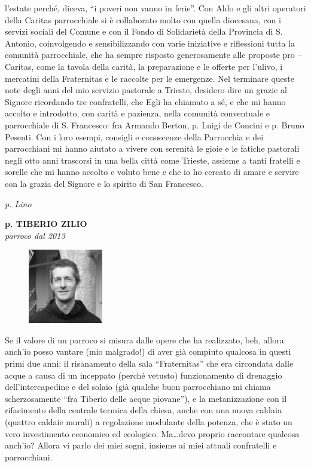 l'estate perché, diceva, “i poveri non vanno in ferie”.
Con Aldo e gli altri operatori della Caritas parrocchiale si è collaborato molto con quella diocesana, 
con i servizi sociali del Comune e con il Fondo di Solidarietà della Provincia di S. Antonio, 
coinvolgendo e sensibilizzando con varie iniziative e riflessioni tutta la comunità parrocchiale, che 
ha sempre risposto generosamente alle proposte pro – Caritas, come la tavola della carità, la 
preparazione e le offerte per l'ulivo, i mercatini della Fraternitas e le raccolte per le emergenze.
Nel  terminare queste note degli anni del mio servizio pastorale a Trieste, desidero dire un 
grazie al Signore ricordando tre confratelli, che Egli ha chiamato a sé, e che mi hanno accolto e 
introdotto, con carità e pazienza, nella comunità conventuale e parrocchiale di S. Francesco: fra 
Armando Berton, p. Luigi de Concini e p. Bruno Pesenti.
Con i loro esempi, consigli e conoscenze della Parrocchia e dei parrocchiani mi hanno aiutato a 
vivere con serenità le gioie e le fatiche pastorali negli otto anni trascorsi in una bella città come 
Trieste, assieme a tanti fratelli e sorelle che mi hanno accolto e voluto bene e che io ho cercato di 
amare e servire con la grazia del Signore e lo spirito di San Francesco. 
\begin{flushright}
\textit{p. Lino}
\end{flushright}
\endgroup
\newpage
\begin{center}
\textbf{\Large p. TIBERIO ZILIO}\\
	\textit{parroco dal 2013}
\end{center}
\bigbreak
\begingroup
\setlength\intextsep{0pt}
\begin{figure}
\centering
\includegraphics[width=0.29\textwidth]{immagini/tiberio.jpg}
\end{figure}
Se il valore di un parroco si misura dalle opere che ha realizzato, beh, allora anch’io posso
vantare (mio malgrado!) di aver già compiuto qualcosa in questi primi due anni: il risanamento 
della sala ``Fraternitas'' che era circondata dalle acque a causa di un inceppato (perché vetusto) 
funzionamento di drenaggio dell’intercapedine e del solaio (già qualche buon parrocchiano mi 
chiama scherzosamente ``fra Tiberio delle acque piovane''), e la metanizzazione con il rifacimento 
della centrale termica della chiesa, anche con una nuova caldaia (quattro caldaie murali) a 
regolazione modulante della potenza, che è stato un vero investimento economico ed ecologico. 
Ma…devo proprio raccontare qualcosa anch’io? Allora vi parlo dei miei sogni, insieme ai miei 
attuali confratelli e parrocchiani. 

